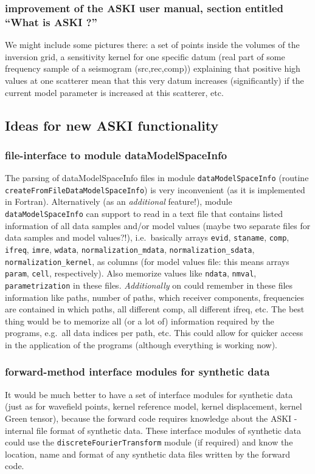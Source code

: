 \documentclass[12pt,a4paper]{article}
\newcommand{\lcode}[1]{\nolinkurl{#1}}
\newcommand{\lcodetitle}[1]{ {\ttfamily #1} }
\newcommand{\ASKI}{ {\ttfamily ASKI} }
\begin{document}
\subsubsection{improvement of the \ASKI{} user manual, section entitled ``What is \ASKI{}?''}
We might include some pictures there: a set of points inside the volumes 
of the inversion grid, a sensitivity kernel for one specific datum (real part of some frequency 
sample of a seismogram (src,rec,comp)) explaining that positive high values at one scatterer mean 
that this very datum increases (significantly) if the current model parameter is increased at this scatterer, etc.

\subsection{Ideas for new \ASKI{} functionality} \label{ssec-todo:new}
\subsubsection{file-interface to module \lcodetitle{dataModelSpaceInfo}}
The parsing of dataModelSpaceInfo files in module \lcode{dataModelSpaceInfo} (routine 
\lcode{createFromFileDataModelSpaceInfo}) is very inconvenient (as it is implemented in Fortran).
Alternatively (as an \emph{additional} feature!), module \lcode{dataModelSpaceInfo} can support to read in
a text file that contains listed information of all data samples and/or model values (maybe two separate files
for data samples and model values?!), i.e.\ basically arrays \lcode{evid}, \lcode{staname}, \lcode{comp}, 
\lcode{ifreq}, \lcode{imre}, \lcode{wdata}, \lcode{normalization_mdata}, \lcode{normalization_sdata}, 
\lcode{normalization_kernel}, as columns (for model values file: this means arrays \lcode{param}, \lcode{cell}, 
respectively). Also memorize values like \lcode{ndata}, \lcode{nmval}, \lcode{parametrization} in these files.
\emph{Additionally} on could remember in these files information like paths, number of paths,
which receiver components, frequencies are contained in which paths, 
all different comp, all different ifreq, etc.
The best thing would be to memorize all (or a lot of) information required by 
the programs, e.g.\ all data indices per path, etc. This could allow for quicker access in the application 
of the programs (although everything is working now).

\subsubsection{forward-method interface modules for synthetic data}
It would be much better to have a set of interface modules for synthetic data (just as
for wavefield points, kernel reference model, kernel displacement, kernel Green tensor), because the forward code
requires knowledge about the \ASKI{}-internal file format of synthetic data. These interface modules of synthetic
data could use the \lcode{discreteFourierTransform} module (if required) and know the location, name and format 
of any synthetic data files written by the forward code.
\end{document}
